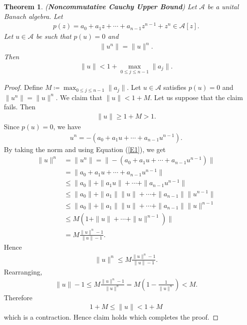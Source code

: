 \documentclass{amsart}
\newtheorem{theorem}{Theorem}[section]
\begin{document}
\begin{theorem} \label{NCB}
(\textbf{Noncommutative Cauchy Upper Bound}) Let $\mathcal{A}$ be a unital Banach algebra. Let 
\begin{align*}
	p(z)=a_0+a_1z+\cdots+a_{n-1}z^{n-1}+z^n\in \mathcal{A}[z].
\end{align*}
Let $u \in \mathcal{A}$ be such that $p(u)=0$ and 
\begin{align}\label{E1}
	\|u^n\|=\|u\|^n.
\end{align}
 Then 
\begin{align*}
		\|u\|< 1+\max_{0\leq j \leq n-1}\|a_j\|.
\end{align*}
\end{theorem}
\begin{proof}
	Define $M\coloneqq \max_{0\leq j \leq n-1}\|a_j\|.$ Let $u \in \mathcal{A}$ satisfies $p(u)=0$ and $\|u^n\|=\|u\|^n$. We claim that $	\|u\|< 1+M$. Let us suppose that the claim fails. Then 
	\begin{align*}
		   	\|u\|\geq 1+M>1.
	\end{align*}
Since $p(u)=0$, we have 
\begin{align*}
	u^n=-(a_0+a_1u+\cdots+a_{n-1}u^{n-1}).
\end{align*}
By taking the norm and using Equation (\ref{E1}), we get 
\begin{align*}
\|u\|^n&=\|u^n\|=\|-(a_0+a_1u+\cdots+a_{n-1}u^{n-1})\|\\
&=\|a_0+a_1u+\cdots+a_{n-1}u^{n-1}\|\\
&\leq \|a_0\|+\|a_1u\|+\cdots+\|a_{n-1}u^{n-1}\|\\
&\leq \|a_0\|+\|a_1\|\|u\|+\cdots+\|a_{n-1}\|\|u^{n-1}\|\\
&\leq \|a_0\|+\|a_1\|\|u\|+\cdots+\|a_{n-1}\|\|u\|^{n-1}\\
&\leq M(1+\|u\|+\cdots+\|u\|^{n-1})\|\\
&=M\frac{\|u\|^n-1}{\|u\|-1}.
\end{align*}
Hence 
\begin{align*}
\|u\|^n\leq M\frac{\|u\|^n-1}{\|u\|-1}. 
\end{align*}
Rearranging, 
\begin{align*}
	\|u\|-1\leq M\frac{\|u\|^n-1}{\|u\|^n}=M \left(1-\frac{1}{\|u\|^n}\right)<M.
\end{align*}
Therefore 
\begin{align*}
	1+M\leq \|u\|<1+M
\end{align*}
which is a contraction. Hence claim holds which completes the proof. 
\end{proof}
\end{document}
